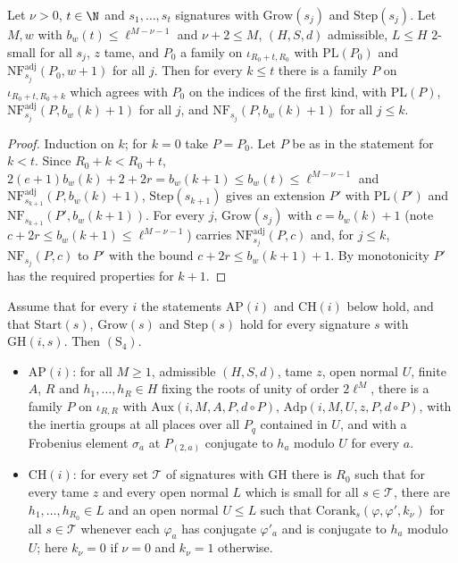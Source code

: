 \begin{lemma}\label{pf:baselat1:induct}
Let $\nu>0$, $t\in\N$ and $s_1,\dots,s_t$ signatures with $\mathrm{Grow}(s_j)$ and $\mathrm{Step}(s_j)$. Let $M,w$ with
$b_w(t)\le\ell^{M-\nu-1}$ and $\nu+2\le M$, $(H,S,d)$ admissible, $L\le H$ $2$-small for all $s_j$, $z$ tame, and $P_0$ a family on
$\iota_{R_0+t,R_0}$ with $\mathrm{PL}(P_0)$ and $\mathrm{NF}^{\mathrm{adj}}_{s_j}(P_0,w+1)$ for all $j$. Then for every $k\le t$ there is a family $P$ on
$\iota_{R_0+t,R_0+k}$ which agrees with $P_0$ on the indices of the first kind, with $\mathrm{PL}(P)$, $\mathrm{NF}^{\mathrm{adj}}_{s_j}(P,b_w(k)+1)$
for all $j$, and $\mathrm{NF}_{s_j}(P,b_w(k)+1)$ for all $j\le k$.
\end{lemma}

\begin{proof}
Induction on $k$; for $k=0$ take $P=P_0$. Let $P$ be as in the statement for $k<t$. Since $R_0+k<R_0+t$,
$2(e+1)b_w(k)+2+2r=b_w(k+1)\le b_w(t)\le\ell^{M-\nu-1}$ and $\mathrm{NF}^{\mathrm{adj}}_{s_{k+1}}(P,b_w(k)+1)$, $\mathrm{Step}(s_{k+1})$ gives an
extension $P'$ with $\mathrm{PL}(P')$ and $\mathrm{NF}_{s_{k+1}}(P',b_w(k+1))$. For every $j$, $\mathrm{Grow}(s_j)$ with $c=b_w(k)+1$ (note
$c+2r\le b_w(k+1)\le\ell^{M-\nu-1}$) carries $\mathrm{NF}^{\mathrm{adj}}_{s_j}(P,c)$ and, for $j\le k$, $\mathrm{NF}_{s_j}(P,c)$ to $P'$ with the bound
$c+2r\le b_w(k+1)+1$. By monotonicity $P'$ has the required properties for $k+1$.
\end{proof}

\begin{proposition}\label{pf:baselat1:thmCparts}
Assume that for every $i$ the statements $\mathrm{AP}(i)$ and $\mathrm{CH}(i)$ below hold, and that $\mathrm{Start}(s)$,
$\mathrm{Grow}(s)$ and $\mathrm{Step}(s)$ hold for every signature $s$ with $\mathrm{GH}(i,s)$. Then $(\mathrm{S}_4)$.
\begin{itemize}
\item $\mathrm{AP}(i)$: for all $M\ge1$, admissible $(H,S,d)$, tame $z$, open normal $U$, finite $A$, $R$ and
  $h_1,\dots,h_R\in H$ fixing the roots of unity of order $2\ell^M$, there is a family $P$ on $\iota_{R,R}$ with
  $\mathrm{Aux}(i,M,A,P,d\circ P)$, $\mathrm{Adp}(i,M,U,z,P,d\circ P)$, with the inertia groups at all places over all $P_q$
  contained in $U$, and with a Frobenius element $\sigma_a$ at $P_{(2,a)}$ conjugate to $h_a$ modulo $U$ for every $a$.
\item $\mathrm{CH}(i)$: for every set $\mathcal T$ of signatures with $\mathrm{GH}$ there is $R_0$ such that for every
  tame $z$ and every open normal $L$ which is small for all $s\in\mathcal T$, there are $h_1,\dots,h_{R_0}\in L$ and an open
  normal $U\le L$ such that $\mathrm{Corank}_s(\varphi,\varphi',k_\nu)$ for all $s\in\mathcal T$ whenever each $\varphi_a$ has
  conjugate $\varphi'_a$ and is conjugate to $h_a$ modulo $U$; here $k_\nu=0$ if $\nu=0$ and $k_\nu=1$ otherwise.
\end{itemize}
\end{proposition}

